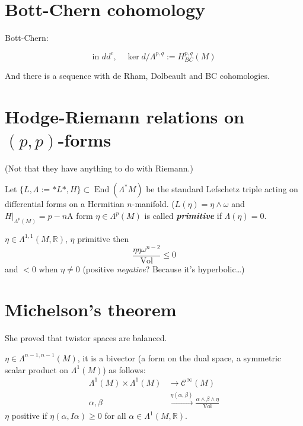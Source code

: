 \section{Bott-Chern cohomology}

\begin{defn}
	Bott-Chern:

	\[\text{in $dd^c,$}\quad  \ker d/\Lambda^{p,q}:=H^{p,q}_{BC}(M)\]
\end{defn}

And there is a sequence with de Rham, Dolbeault and BC cohomologies.

\section{Hodge-Riemann relations on $(p,p)$-forms}

(Not that they have anything to do with Riemann.)

\begin{defn}
	Let $\{L,\Lambda:=*L*, H\}\subset \operatorname{End}(\Lambda^*M)$ be the standard Lefschetz triple acting on differential forms on a Hermitian $n$-manifold. ($L(\eta)=\eta\wedge \omega$ and $H|_{\Lambda^p(M)}=p-n$A form $\eta\in\Lambda^p(M)$ is called \textit{\textbf{primitive}} if  $\Lambda(\eta)=0$.
\end{defn}

\begin{prop}
	$\eta\in\Lambda^{1,1}(M,\mathbb{R})$, $\eta$ primitive then
	\[\frac{\eta\eta\omega^{n-2}}{\operatorname{Vol}}\leq 0\]
	and $<0$ when  $\eta\neq 0$ (positive \textit{negative}? Because it's hyperbolic…)
\end{prop}

\section{Michelson's theorem}

She proved that twistor spaces are balanced.

$\eta\in\Lambda^{n-1,n-1}(M)$, it is a bivector (a form on the dual space, a symmetric scalar product on $\Lambda^{1}(M)$) as follows:
\begin{align*}
	\Lambda^{1}(M) \times \Lambda^{1}(M)  &\longrightarrow \mathcal{C}^\infty(M) \\
	\alpha,\beta &\overset{\eta(\alpha,\beta)}{\longrightarrow}\frac{\alpha\wedge \beta\wedge \eta}{\operatorname{Vol}}
\end{align*}
$\eta$ positive if $\eta(\alpha,I\alpha)\geq 0$ for all $\alpha\in\Lambda^{1}(M,\mathbb{R})$.

